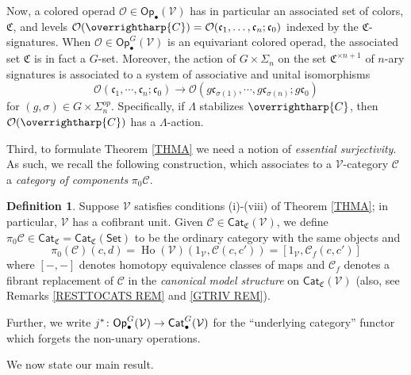 \documentclass[a4paper,10pt
,draft
]{article}%
\numberwithin{equation}{section}
\numberwithin{figure}{section}
\theoremstyle{definition} %
\newtheorem{definition}[equation]{Definition}%
\newcommand{\vect}[1]{\text{\overrightharp{\ensuremath{#1}}}}
\newcommand{\Cat}{\mathsf{Cat}}
\newcommand{\Op}{\mathsf{Op}}%
\DeclareMathOperator{\Ho}{Ho}
\newcommand{\V}{\ensuremath{\mathcal V}}
\renewcommand{\O}{\ensuremath{\mathcal O}}
\newcommand{\1}{\ensuremath{\mathbbm 1}}%
\begin{document}
Now, a colored operad $\O \in \Op_\bullet(\V)$
has in particular
an associated set of colors, $\mathfrak C$, 
and levels $\O(\vect C) = \O(\mathfrak c_1, \dots, \mathfrak c_n; \mathfrak c_0)$ indexed by the $\mathfrak C$-signatures.
When $\O \in \Op_\bullet^G(\V)$ is an equivariant colored operad, the associated set $\mathfrak C$ is in fact a $G$-set.
Moreover, the action of $G \times \Sigma_n$ on the set $\mathfrak C^{\times n+1}$ of $n$-ary signatures
is associated to
a system of associative and unital isomorphisms
\begin{equation}\label{OPSSYMS EQ}
        \O(\mathfrak{c}_1,\cdots,\mathfrak{c}_n;\mathfrak{c}_0)
        \to 
        \O(g \mathfrak{c}_{\sigma(1)},\cdots,g \mathfrak{c}_{\sigma(n)};g\mathfrak{c}_0)
\end{equation}
for $(g,\sigma) \in G \times \Sigma_n^{op}$.
%
Specifically, if $\Lambda$ stabilizes $\vect C$, then
$\O(\vect C)$ has a $\Lambda$-action.





Third, to formulate Theorem \ref{THMA} we need a notion of 
\emph{essential surjectivity}.
As such, we recall the following construction, 
which associates to a $\V$-category $\mathcal{C}$
a \emph{category of components} $\pi_0 \mathcal{C}$.

\begin{definition}
	Suppose $\V$ satisfies conditions (i)-(viii) of Theorem \ref{THMA};
	in particular, $\V$ has a cofibrant unit.
	Given $\mathcal C \in \Cat_{\mathfrak{C}}(\V)$, we define 
	$\pi_0 \mathcal C \in \Cat_{\mathfrak{C}} = \Cat_{\mathfrak{C}}(\mathsf{Set})$ 
	to be the ordinary category with the same objects and
        \[
                \pi_0(\mathcal{C})(c,d)=
                \Ho(\V)(1_\V, \mathcal C(c,c'))=
                [1_\V, \mathcal{C}_f(c,c')]
        \]
        where $[-,-]$ denotes homotopy equivalence classes of maps
        and $\mathcal{C}_f$ denotes a fibrant replacement of
        $\mathcal C$ in the \emph{canonical model structure} on $\Cat_{\mathfrak{C}}(\V)$
        \cite{BM13} (also, see Remarks 
        \ref{RESTTOCATS REM} and \ref{GTRIV REM}).
\end{definition}

Further, we write
$j^{\**} \colon 
\mathsf{Op}^G_{\bullet}(\V) \to \mathsf{Cat}^G_{\bullet}(\V)$
for the ``underlying category''
functor which forgets the non-unary operations.

\vskip 10pt

We now state our main result.
\end{document}
